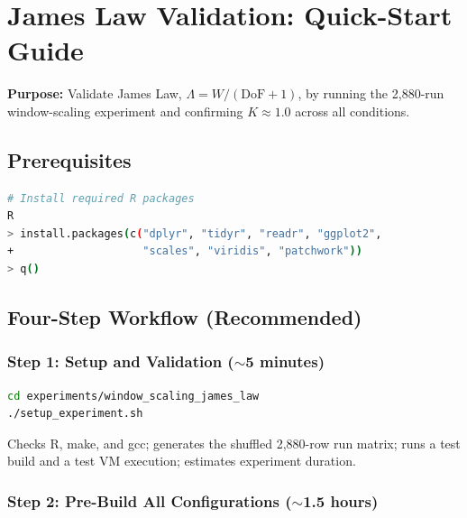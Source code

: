 
\section{James Law Validation: Quick-Start Guide}

\textbf{Purpose:} Validate James Law, $\Lambda = W / (\text{DoF} + 1)$, by
running the 2{,}880-run window-scaling experiment and confirming $K \approx 1.0$
across all conditions.


\subsection{Prerequisites}

\begin{lstlisting}[language=bash]
# Install required R packages
R
> install.packages(c("dplyr", "tidyr", "readr", "ggplot2",
+                    "scales", "viridis", "patchwork"))
> q()
\end{lstlisting}

\subsection{Four-Step Workflow (Recommended)}

\subsubsection{Step 1: Setup and Validation ($\sim$5 minutes)}

\begin{lstlisting}[language=bash]
cd experiments/window_scaling_james_law
./setup_experiment.sh
\end{lstlisting}

Checks R, make, and gcc; generates the shuffled 2{,}880-row run matrix;
runs a test build and a test VM execution; estimates experiment duration.

\subsubsection{Step 2: Pre-Build All Configurations ($\sim$1.5 hours)}

